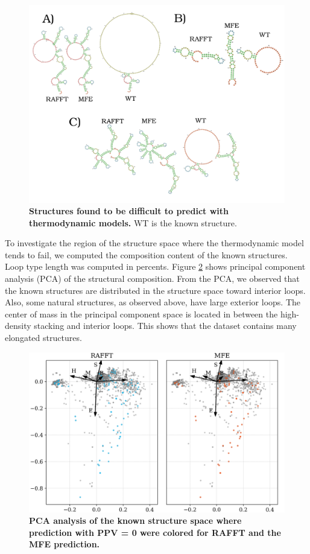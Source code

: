 \documentclass[a4paper,12pt]{article}
\begin{document}
{{\begin{figure}[htbp]
\centering
\includegraphics[scale=0.6]{img/comb_rna_struct.png}
\caption{\label{diff_struct}\textbf{Structures found to be difficult to predict with thermodynamic models.} WT is the known structure.}
\end{figure}

To investigate the region of the structure space where the thermodynamic model
tends to fail, we computed the composition content of the known structures. Loop
type length was computed in percents. Figure \ref{pca_fails} shows principal
component analysis (PCA) of the structural composition. From the PCA, we
observed that the known structures are distributed in the structure space toward
interior loops. Also, some natural structures, as observed above, have large
exterior loops. The center of mass in the principal component space is located
in between the high-density stacking and interior loops. This shows that the
dataset contains many elongated structures.

\begin{figure}[htbp]
\centering
\includegraphics[scale=0.5]{img/comp_fails.png}
\caption{\label{pca_fails}\textbf{PCA analysis of the known structure space where prediction with PPV = 0 were colored for RAFFT and the MFE prediction.}}
\end{figure}

}}
\end{document}
